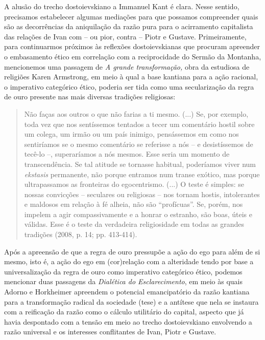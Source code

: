 A alusão do trecho dostoievskiano a Immanuel Kant é clara. Nesse
sentido, precisamos estabelecer algumas mediações para que possamos
compreender quais são as decorrências da aniquilação da razão pura para
o acirramento capitalista das relações de Ivan com -- ou pior, contra --
Piotr e Gustave. Primeiramente, para continuarmos próximos às reflexões
dostoievskianas que procuram apreender o embasamento ético em correlação
com a reciprocidade do Sermão da Montanha, mencionemos uma passagem de
\emph{A grande transformação,} obra da estudiosa de religiões Karen
Armstrong, em meio à qual a base kantiana para a ação racional, o
imperativo categórico ético, poderia ser tida como uma secularização da
regra de ouro presente nas mais diversas tradições religiosas:

\begin{quote}
Não faças aos outros o que não farias a ti mesmo. (...) Se, por exemplo,
toda vez que nos sentíssemos tentados a tecer um comentário hostil sobre
um colega, um irmão ou um país inimigo, pensássemos em como nos
sentiríamos se o mesmo comentário se referisse a nós -- e desistíssemos
de tecê-lo --, superaríamos a nós mesmos. Esse seria um momento de
transcendência. Se tal atitude se tornasse habitual, poderíamos viver
num \emph{ekstasis} permanente, não porque entramos num transe exótico,
mas porque ultrapassamos as fronteiras do egocentrismo. (...) O teste é
simples: se nossas convicções -- seculares ou religiosas -- nos tornam
hostis, intolerantes e maldosos em relação à fé alheia, não são
``profícuas''. Se, porém, nos impelem a agir compassivamente e a honrar
o estranho, são boas, úteis e válidas. Esse é o teste da verdadeira
religiosidade em todas as grandes tradições (2008, p. 14; pp. 413-414).
\end{quote}

Após a apreensão de que a regra de ouro pressupõe a ação do ego para
além de si mesmo, isto é, a ação do ego em (cor)relação com a alteridade
tendo por base a universalização da regra de ouro como imperativo
categórico ético, podemos mencionar duas passagens da \emph{Dialética do
Esclarecimento}, em meio às quais Adorno e Horkheimer apreendem o
potencial emancipatório da razão kantiana para a transformação radical
da sociedade (tese) e a antítese que nela se instaura com a reificação
da razão como o cálculo utilitário do capital, aspecto que já havia
despontado com a tensão em meio ao trecho dostoievskiano envolvendo a
razão universal e os interesses conflitantes de Ivan, Piotr e Gustave.

